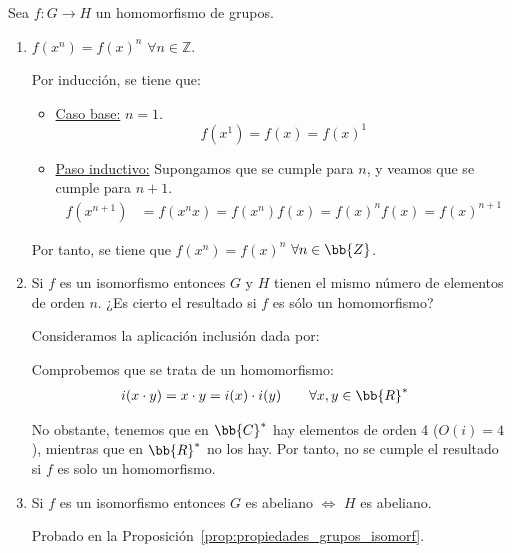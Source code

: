 \begin{ejercicio}\label{ej:2.35}
    Sea $f : G \to H$ un homomorfismo de grupos.
    \begin{enumerate}
        \item $f(x^n) = f(x)^n$ $\forall n \in \mathbb{Z}$.
        
        Por inducción, se tiene que:
        \begin{itemize}
            \item \ul{Caso base:} $n=1$.
            \begin{equation*}
                f(x^1)=f(x)=f(x)^1
            \end{equation*}

            \item \ul{Paso inductivo:} Supongamos que se cumple para $n$, y veamos que se cumple para $n+1$.
            \begin{align*}
                f(x^{n+1})&=f(x^n x)=f(x^n)f(x)=f(x)^n f(x)=f(x)^{n+1}
            \end{align*}
        \end{itemize}

        Por tanto, se tiene que $f(x^n)=f(x)^n$ $\forall n\in \bb{Z}$.
        \item Si $f$ es un isomorfismo entonces $G$ y $H$ tienen el mismo número de elementos de orden $n$. ¿Es cierto el resultado si $f$ es sólo un homomorfismo?
        
        Consideramos la aplicación inclusión dada por:

        Comprobemos que se trata de un homomorfismo:
        \begin{align*}
            i(x\cdot y)&=x\cdot y=i(x)\cdot i(y)\qquad \forall x,y\in \bb{R}^*
        \end{align*}

        No obstante, tenemos que en $\bb{C}^*$ hay elementos de orden 4 ($O(i)=4$), mientras que en $\bb{R}^*$ no los hay. Por tanto, no se cumple el resultado si $f$ es solo un homomorfismo.
        \item Si $f$ es un isomorfismo entonces $G$ es abeliano $\Leftrightarrow$ $H$ es abeliano.
        
        Probado en la Proposición~\ref{prop:propiedades_grupos_isomorf}.
    \end{enumerate}
\end{ejercicio}

